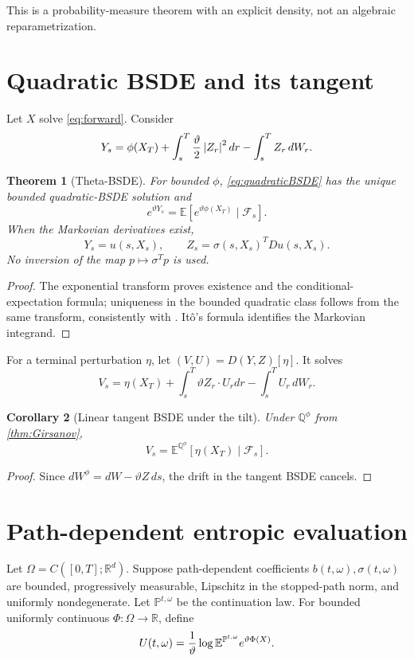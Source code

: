 \documentclass[11pt,reqno]{amsart}
\newtheorem{theorem}{Theorem}[section]
\newtheorem{corollary}[theorem]{Corollary}
\theoremstyle{definition}
\theoremstyle{remark}
\newcommand{\E}{\mathbb E}
\newcommand{\F}{\mathcal F}
\newcommand{\Pp}{\mathbb P}
\newcommand{\Qp}{\mathbb Q}
\newcommand{\R}{\mathbb R}
\newcommand{\abs}[1]{\left\lvert #1\right\rvert}
\begin{document}
This is a probability-measure theorem with an explicit density, not an
algebraic reparametrization.

\section{Quadratic BSDE and its tangent}\label{sec:BSDE}
Let $X$ solve \eqref{eq:forward}.  Consider
\begin{equation}\label{eq:quadraticBSDE}
 Y_s=\phi(X_T)+\int_s^T{\vartheta\over2}\abs{Z_r}^2dr
 -\int_s^TZ_r\,dW_r.
\end{equation}

\begin{theorem}[Theta-BSDE]\label{thm:BSDE}
For bounded $\phi$, \eqref{eq:quadraticBSDE} has the unique bounded
quadratic-BSDE solution and
\[
 e^{\vartheta Y_s}
 =\E[e^{\vartheta\phi(X_T)}\mid\F_s].
\]
When the Markovian derivatives exist,
\[
 Y_s=u(s,X_s),
 \qquad Z_s=\sigma(s,X_s)^TDu(s,X_s).
\]
No inversion of the map $p\mapsto\sigma^Tp$ is used.
\end{theorem}

\begin{proof}
The exponential transform proves existence and the conditional-expectation
formula; uniqueness in the bounded quadratic class follows from the same
transform, consistently with \cite{Kobylanski2000}.  It\^o's formula identifies
the Markovian integrand.
\end{proof}

For a terminal perturbation $\eta$, let $(V,U)=D(Y,Z)[\eta]$.  It solves
\[
 V_s=\eta(X_T)+\int_s^T\vartheta Z_r\cdot U_rdr
 -\int_s^TU_r\,dW_r.
\]

\begin{corollary}[Linear tangent BSDE under the tilt]\label{cor:tangentBSDE}
Under $\Qp^{\phi}$ from \cref{thm:Girsanov},
\[
 V_s=\E^{\Qp^{\phi}}[\eta(X_T)\mid\F_s].
\]
\end{corollary}

\begin{proof}
Since $dW^{\phi}=dW-\vartheta Z\,ds$, the drift in the tangent BSDE cancels.
\end{proof}

\section{Path-dependent entropic evaluation}\label{sec:path}
Let $\Omega=C([0,T];\R^d)$.  Suppose path-dependent coefficients
$b(t,\omega),\sigma(t,\omega)$ are bounded, progressively measurable,
Lipschitz in the stopped-path norm, and uniformly nondegenerate.  Let
$\Pp^{t,\omega}$ be the continuation law.  For bounded uniformly continuous
$\Phi:\Omega\to\R$, define
\begin{equation}\label{eq:pathvalue}
 U(t,\omega)={1\over\vartheta}
 \log\E^{\Pp^{t,\omega}}e^{\vartheta\Phi(X)}.
\end{equation}
\end{document}
